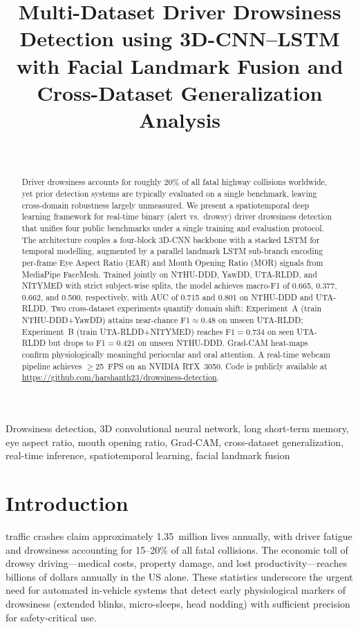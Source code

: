 \documentclass[journal]{IEEEtran}
\title{Multi-Dataset Driver Drowsiness Detection using 3D-CNN--LSTM with Facial Landmark Fusion and Cross-Dataset Generalization Analysis}
\author{
\IEEEauthorblockN{Harshanth Ravindran, Rithik Balasubramanian, Kirubavathi Ganapathiyappan \IEEEauthorrefmark{1}}\\
\IEEEauthorblockA{
\textit{Department of Mathematics} \\

\textit{Amrita School of Physical Sciences},
\textit{Amrita Vishwa Vidyapeetham} \\
harshanthravi6474@gmail.com, rithikrithik222@gmail.com,\\ g\_kirubavathi@cb.amrita.edu
\IEEEauthorblockA{\IEEEauthorrefmark{1}Corresponding author}
}
}
\begin{document}
\maketitle

\begin{abstract}
Driver drowsiness accounts for roughly 20\% of all fatal highway collisions worldwide, yet prior detection systems are typically evaluated on a single benchmark, leaving cross-domain robustness largely unmeasured. We present a spatiotemporal deep learning framework for real-time binary (alert vs.\ drowsy) driver drowsiness detection that unifies four public benchmarks under a single training and evaluation protocol. The architecture couples a four-block 3D-CNN backbone with a stacked LSTM for temporal modelling, augmented by a parallel landmark LSTM sub-branch encoding per-frame Eye Aspect Ratio (EAR) and Mouth Opening Ratio (MOR) signals from MediaPipe FaceMesh. Trained jointly on NTHU-DDD, YawDD, UTA-RLDD, and NITYMED with strict subject-wise splits, the model achieves macro-F1 of 0.665, 0.377, 0.662, and 0.500, respectively, with AUC of 0.715 and 0.801 on NTHU-DDD and UTA-RLDD. Two cross-dataset experiments quantify domain shift: Experiment~A (train NTHU-DDD+YawDD) attains near-chance F1$\approx$0.48 on unseen UTA-RLDD; Experiment~B (train UTA-RLDD+NITYMED) reaches F1$=$0.734 on seen UTA-RLDD but drops to F1$=$0.421 on unseen NTHU-DDD. Grad-CAM heat-maps confirm physiologically meaningful periocular and oral attention. A real-time webcam pipeline achieves $\geq$25~FPS on an NVIDIA RTX~3050.
Code is publicly available at \textcolor{blue}{\url{https://github.com/harshanth23/drowsiness-detection}}.
\end{abstract}

\begin{IEEEkeywords}
Drowsiness detection, 3D convolutional neural network, long short-term memory, eye aspect ratio, mouth opening ratio, Grad-CAM, cross-dataset generalization, real-time inference, spatiotemporal learning, facial landmark fusion
\end{IEEEkeywords}

\section{Introduction}
\label{sec:intro}

 traffic crashes claim approximately 1.35~million lives annually, with driver fatigue and drowsiness accounting for 15--20\% of all fatal collisions\cite{horne2001,who2023}. The economic toll of drowsy driving---medical costs, property damage, and lost productivity---reaches billions of dollars annually in the US alone\cite{tefft2014}. These statistics underscore the urgent need for automated in-vehicle systems that detect early physiological markers of drowsiness (extended blinks, micro-sleeps, head nodding) with sufficient precision for safety-critical use.
\end{document}
